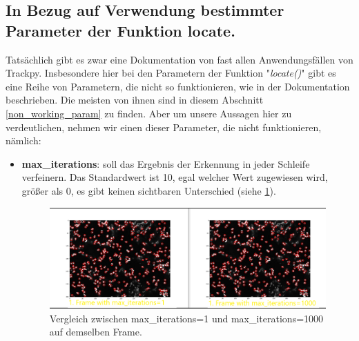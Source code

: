 \newpage

\subsection{In Bezug auf Verwendung bestimmter Parameter der Funktion locate. \label{kap2.2.d_verwendung_locate_param}}
Tatsächlich gibt es zwar eine Dokumentation von fast allen Anwendungsfällen von Trackpy. Insbesondere hier bei den Parametern der Funktion "\textit{locate()}" gibt es eine Reihe von Parametern, die nicht so funktionieren, wie in der Dokumentation beschrieben. 
Die meisten von ihnen sind in diesem Abschnitt \ref{non_working_param} zu finden. 
Aber um unsere Aussagen hier zu verdeutlichen, nehmen wir einen dieser Parameter, die nicht funktionieren, nämlich:

\begin{itemize} 
	\item \textbf{max\_iterations}: soll das Ergebnis der Erkennung in jeder Schleife verfeinern. Das Standardwert ist 10, egal welcher Wert zugewiesen wird, größer als 0, es gibt keinen sichtbaren Unterschied (siehe \ref{fig:comparison max-iterations}). 
	\begin{figure}[H]
    \centering
    \includegraphics[scale=0.35]{Grafiken/trackpyBilder/comparison max_iterations.png}
    \caption{Vergleich zwischen max\_iterations=1 und max\_iterations=1000 auf demselben Frame.}
    \label{fig:comparison max-iterations}
\end{figure} 
	
\end{itemize}
